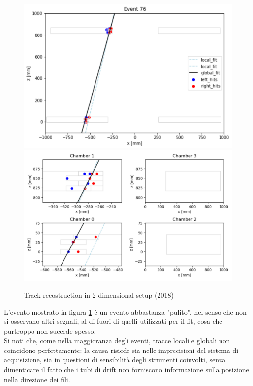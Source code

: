 \documentclass[a4paper,11pt]{book}
\begin{document}
\begin{figure}[hbtp]
\centering
\includegraphics[scale=0.4]{pictures/2D_example_global.pdf}\hfill
\includegraphics[scale=0.4]{pictures/2D_example_chambers.pdf}
\caption{Track recostruction in 2-dimensional setup (2018)}
\label{fig:example_track_2018}
\end{figure}

L'evento mostrato in figura \ref{fig:example_track_2018} è un evento abbastanza "pulito", nel senso che non si osservano altri segnali, al di fuori di quelli utilizzati per il fit, cosa che purtroppo non succede spesso.\\
Si noti che, come nella maggioranza degli eventi, tracce locali e globali non coincidono perfettamente:  la causa risiede sia nelle imprecisioni del sistema di acquisizione, sia in questioni di sensibilità degli strumenti coinvolti, senza dimenticare il fatto che i tubi di drift non forniscono informazione sulla posizione nella direzione dei fili.\\
\end{document}

